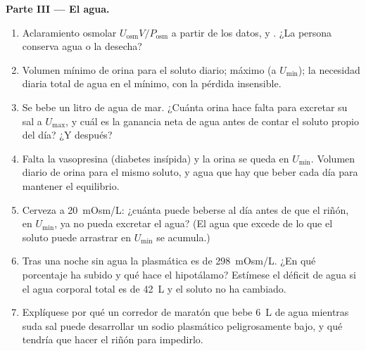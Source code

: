 \begin{problem}
\medskip
\noindent\textbf{Parte III --- El agua.}
\begin{enumerate}[resume]
  \item Aclaramiento osmolar $U_{\text{osm}}V/P_{\text{osm}}$ a partir
        de los datos, y . ¿La persona
        conserva agua o la desecha?
  \item Volumen mínimo de orina para el soluto diario; máximo (a
        $U_{\min}$); la necesidad diaria total de agua en el mínimo,
        con la pérdida insensible.
  \item Se bebe un litro de agua de mar. ¿Cuánta orina hace falta para
        excretar su sal a $U_{\max}$, y cuál es la ganancia neta de
        agua antes de contar el soluto propio del día? ¿Y después?
  \item Falta la vasopresina (diabetes insípida) y la orina se queda en
        $U_{\min}$. Volumen diario de orina para el mismo soluto, y
        agua que hay que beber cada día para mantener el equilibrio.
  \item Cerveza a \qty{20}{mOsm/L}: ¿cuánta puede beberse al día antes
        de que el riñón, en $U_{\min}$, ya no pueda excretar el agua?
        (El agua que excede de lo que el soluto puede arrastrar en
        $U_{\min}$ se acumula.)
  \item Tras una noche sin agua la  plasmática es de
        \qty{298}{mOsm/L}. ¿En qué porcentaje ha subido y qué hace el
        hipotálamo? Estímese el déficit de agua si el agua corporal
        total es de \qty{42}{L} y el soluto no ha cambiado.
  \item Explíquese por qué un corredor de maratón que bebe \qty{6}{L}
        de agua mientras suda sal puede desarrollar un sodio plasmático
        peligrosamente bajo, y qué tendría que hacer el riñón para
        impedirlo.
\end{enumerate}


\end{problem}
